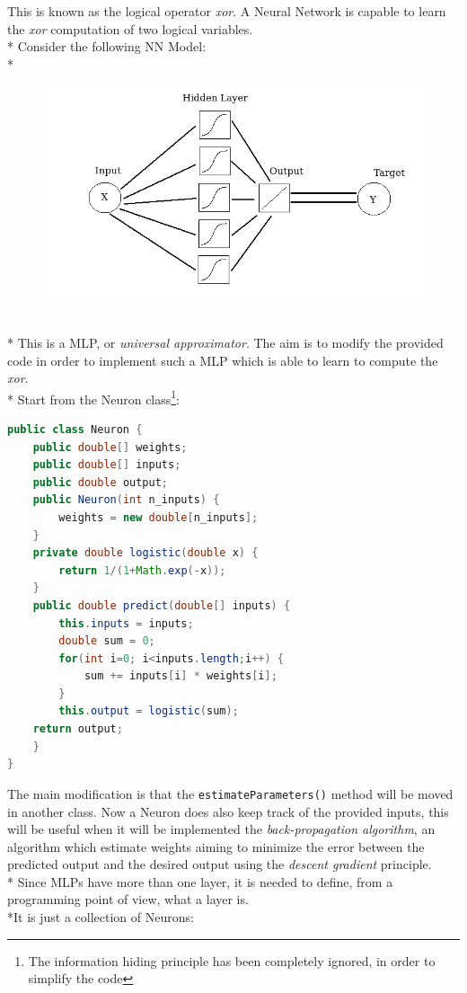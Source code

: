 \documentclass[10pt,a4paper]{article}
\begin{document}
This is known as the logical operator \textit{xor}. A Neural Network is capable to learn the \textit{xor} computation of two logical variables.\\*
Consider the following NN Model:\\*
\begin{figure}[h]
	\centering
	\includegraphics[width=0.7\linewidth]{img/mymodel}
	\label{fig:mymodel}
\end{figure}\\*
This is a MLP, or \emph{universal approximator}. The aim is to modify the provided code in order to implement such a MLP which is able to learn to compute the \emph{xor}.\\*
Start from the Neuron class\footnote{The information hiding principle has been completely ignored, in order to simplify the code}:
\begin{lstlisting}[language=Java]
public class Neuron {
	public double[] weights;
	public double[] inputs;
	public double output;
	public Neuron(int n_inputs) {
		weights = new double[n_inputs];
	}
	private double logistic(double x) {
		return 1/(1+Math.exp(-x));
	}
	public double predict(double[] inputs) {
		this.inputs = inputs;
		double sum = 0;
		for(int i=0; i<inputs.length;i++) {
			sum += inputs[i] * weights[i];
		}
		this.output = logistic(sum);
	return output;
	}
}
\end{lstlisting}
The main modification is that the \texttt{estimateParameters()} method will be moved in another class. Now a Neuron does also keep track of the provided inputs, this will be useful when it will be implemented the \emph{back-propagation algorithm}, an algorithm which estimate weights aiming to minimize the error between the predicted output and the desired output using the \emph{descent gradient} principle.\\*
Since MLPs have more than one layer, it is needed to define, from a programming point of view, what a layer is.\\*It is just a collection of Neurons:
\end{document}
